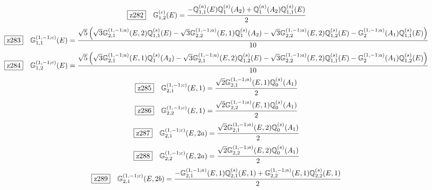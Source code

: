 \documentclass[fleqn,10pt,landscape]{jsarticle}
\begin{document}
\begin{dmath*}
\hspace*{3mm}\fbox{z282}\quad \mathbb{G}_{1,2}^{(c)}(E)=\frac{- \mathbb{Q}_{1,1}^{(a)}(E) \mathbb{Q}_{1}^{(s)}(A_{2}) + \mathbb{Q}_{1}^{(a)}(A_{2}) \mathbb{Q}_{1,1}^{(s)}(E)}{2}
\end{dmath*}
\begin{dmath*}
\hspace*{3mm}\fbox{z283}\quad \mathbb{G}_{1,1}^{(1,-1;c)}(E)=\frac{\sqrt{5} \left(\sqrt{3} \mathbb{G}_{2,1}^{(1,-1;a)}(E,2) \mathbb{Q}_{1,1}^{(s)}(E) - \sqrt{3} \mathbb{G}_{2,2}^{(1,-1;a)}(E,1) \mathbb{Q}_{1}^{(s)}(A_{2}) - \sqrt{3} \mathbb{G}_{2,2}^{(1,-1;a)}(E,2) \mathbb{Q}_{1,2}^{(s)}(E) - \mathbb{G}_{2}^{(1,-1;a)}(A_{1}) \mathbb{Q}_{1,1}^{(s)}(E)\right)}{10}
\end{dmath*}
\begin{dmath*}
\hspace*{3mm}\fbox{z284}\quad \mathbb{G}_{1,2}^{(1,-1;c)}(E)=\frac{\sqrt{5} \left(\sqrt{3} \mathbb{G}_{2,1}^{(1,-1;a)}(E,1) \mathbb{Q}_{1}^{(s)}(A_{2}) - \sqrt{3} \mathbb{G}_{2,1}^{(1,-1;a)}(E,2) \mathbb{Q}_{1,2}^{(s)}(E) - \sqrt{3} \mathbb{G}_{2,2}^{(1,-1;a)}(E,2) \mathbb{Q}_{1,1}^{(s)}(E) - \mathbb{G}_{2}^{(1,-1;a)}(A_{1}) \mathbb{Q}_{1,2}^{(s)}(E)\right)}{10}
\end{dmath*}
\begin{dmath*}
\hspace*{3mm}\fbox{z285}\quad \mathbb{G}_{2,1}^{(1,-1;c)}(E,1)=\frac{\sqrt{2} \mathbb{G}_{2,1}^{(1,-1;a)}(E,1) \mathbb{Q}_{0}^{(s)}(A_{1})}{2}
\end{dmath*}
\begin{dmath*}
\hspace*{3mm}\fbox{z286}\quad \mathbb{G}_{2,2}^{(1,-1;c)}(E,1)=\frac{\sqrt{2} \mathbb{G}_{2,2}^{(1,-1;a)}(E,1) \mathbb{Q}_{0}^{(s)}(A_{1})}{2}
\end{dmath*}
\begin{dmath*}
\hspace*{3mm}\fbox{z287}\quad \mathbb{G}_{2,1}^{(1,-1;c)}(E,2a)=\frac{\sqrt{2} \mathbb{G}_{2,1}^{(1,-1;a)}(E,2) \mathbb{Q}_{0}^{(s)}(A_{1})}{2}
\end{dmath*}
\begin{dmath*}
\hspace*{3mm}\fbox{z288}\quad \mathbb{G}_{2,2}^{(1,-1;c)}(E,2a)=\frac{\sqrt{2} \mathbb{G}_{2,2}^{(1,-1;a)}(E,2) \mathbb{Q}_{0}^{(s)}(A_{1})}{2}
\end{dmath*}
\begin{dmath*}
\hspace*{3mm}\fbox{z289}\quad \mathbb{G}_{2,1}^{(1,-1;c)}(E,2b)=\frac{- \mathbb{G}_{2,1}^{(1,-1;a)}(E,1) \mathbb{Q}_{2,1}^{(s)}(E,1) + \mathbb{G}_{2,2}^{(1,-1;a)}(E,1) \mathbb{Q}_{2,2}^{(s)}(E,1)}{2}
\end{dmath*}
\end{document}
